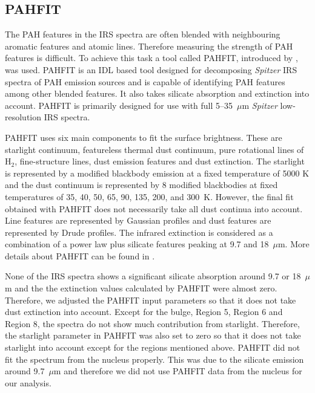 \subsection{PAHFIT}

The PAH features in the IRS spectra are often blended with neighbouring aromatic features and atomic lines. Therefore measuring the strength of PAH features is difficult. To achieve this task a tool called PAHFIT, introduced by \citet{Smith:2007lr}, was used. PAHFIT is an IDL  based tool designed for decomposing {\em Spitzer} IRS spectra of PAH emission sources and is capable of identifying PAH features among other blended features. It also takes silicate absorption and extinction into account. PAHFIT is primarily designed for use with full 5--35~$\mu$m {\em Spitzer} low-resolution IRS spectra.

PAHFIT uses six main components to fit the surface brightness. These are starlight continuum, featureless thermal dust continuum, pure rotational lines of H$_2$, fine-structure lines, dust emission features and dust extinction. The starlight is represented by a modified blackbody emission at a fixed temperature of 5000 K and the dust continuum is represented by 8 modified blackbodies at fixed temperatures of 35, 40, 50, 65, 90, 135, 200, and 300~K. However, the final fit obtained with PAHFIT does not necessarily take all dust continua into account. Line features are represented by Gaussian profiles and dust features are represented by Drude profiles. The infrared extinction is considered as a combination of a power law plus silicate features peaking at 9.7 and 18~$\mu$m. More details about PAHFIT can be found in \citet{Smith:2007lr}.


None of the IRS spectra shows a significant silicate absorption around 9.7 or 18~$\mu$m and the the extinction values calculated by PAHFIT were almost zero. Therefore, we adjusted the PAHFIT input parameters so that it does not take dust extinction into account. Except for the bulge, Region 5, Region 6 and Region 8, the spectra do not show much contribution from starlight. 
Therefore, the starlight parameter in PAHFIT was also set to zero so that it does not take starlight into account except for the regions mentioned above. 
PAHFIT did not fit the spectrum from the nucleus properly. This was due to the silicate emission around 9.7~$\mu$m and therefore we did not use PAHFIT data from the nucleus for our analysis.



